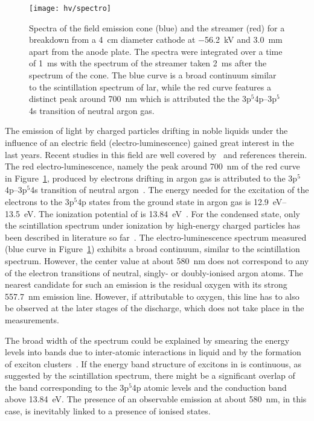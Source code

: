 \begin{figure}[htb]
	\centering
	\texttt{[image: hv/spectro]}
	\caption[ test field emission and streamer spectra]{%
		Spectra of the field emission cone (blue) and the streamer (red) for a breakdown from a \SI{4}{\centi\metre} diameter cathode at \SI{-56.2}{\kilo\volt} and \SI{3.0}{\milli\metre} apart from the anode plate.
		The spectra were integrated over a time of \SI{1}{\milli\second} with the spectrum of the streamer taken \SI{2}{\milli\second} after the spectrum of the cone.
		The blue curve is a broad continuum similar to the scintillation spectrum of \acrshort{lar}, while the red curve features a distinct peak around \SI{700}{\nano\metre} which is attributed the the 3p$^5$4p--3p$^5$4s transition of neutral argon gas.
	}
	\label{fig:hv_spectro}
\end{figure}

The emission of light by charged particles drifting in noble liquids under the influence of an electric field (electro-luminescence) gained great interest in the last years.
Recent studies in this field are well covered by~\cite{buzulutskov1, buzulutskov2, buzulutskov3} and references therein.
The red electro-luminescence, namely the peak around \SI{700}{\nano\metre} of the red curve in Figure~\ref{fig:hv_spectro}, produced by electrons drifting in argon gas is attributed to the 3p$^5$4p--3p$^5$4s transition of neutral argon~\cite{Boffard}.
The energy needed for the excitation of the electrons to the 3p$^5$4p states from the ground state in argon gas is \SIrange{12.9}{13.5}{\electronvolt}.
The ionization potential of \lar{} is \SI{13.84}{\electronvolt}~\cite{2photonAbs}.
For the condensed state, only the scintillation spectrum under ionization by high-energy charged particles has been described in literature so far~\cite{Heindl}.
The electro-luminescence spectrum measured (blue curve in Figure~\ref{fig:hv_spectro}) exhibits a broad continuum, similar to the scintillation spectrum.
However, the center value at about \SI{580}{\nano\metre} does not correspond to any of the electron transitions of neutral, singly- or doubly-ionised argon atoms.
The nearest candidate for such an emission is the residual oxygen with its strong \SI{557.7}{\nano\metre} emission line.
However, if attributable to oxygen, this line has to also be observed at the later stages of the discharge, which does not take place in the measurements.

The broad width of the spectrum could be explained by smearing the energy levels into bands due to inter-atomic interactions in liquid and by the formation of exciton clusters~\cite{Bernstorff, Foerstel}.
If the energy band structure of excitons in \lar{} is continuous, as suggested by the scintillation spectrum, there might be a significant overlap of the band corresponding to the 3p$^5$4p atomic levels and the conduction band above \SI{13.84}{\electronvolt}.
The presence of an observable emission at about \SI{580}{\nano\metre}, in this case, is inevitably linked to a presence of ionised states.

